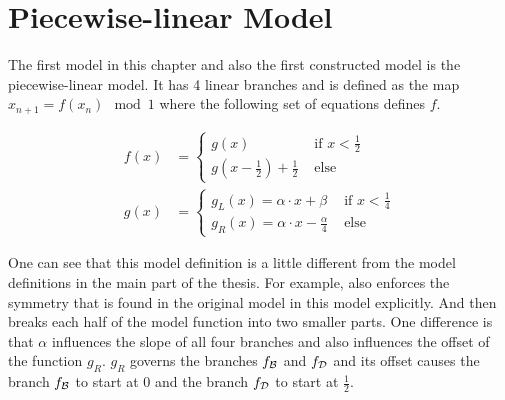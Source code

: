 \section{Piecewise-linear Model}

The first model in this chapter and also the first constructed model is the piecewise-linear model.
It has 4 linear branches and is defined as the map $x_{n+1} = f(x_n) \mod 1$ where the following set of equations defines $f$.

\begin{align}
	f(x) & = \begin{cases}
		         g(x)                                        & \text{ if } x < \frac{1}{2} \\
		         g\left(x - \frac{1}{2}\right) + \frac{1}{2} & \text{ else}
	         \end{cases} \label{equ:app.model.lin.f} \\
	g(x) & = \begin{cases}
		         g_L(x) = \alpha \cdot x + \beta            & \text{ if } x < \frac{1}{4} \\
		         g_R(x) = \alpha \cdot x - \frac{\alpha}{4} & \text{ else}
	         \end{cases} \label{equ:app.model.lin.g}
\end{align}

One can see that this model definition is a little different from the model definitions in the main part of the thesis.
For example,  also enforces the symmetry that is found in the original model in this model explicitly.
And  then breaks each half of the model function into two smaller parts.
One difference is that $\alpha$ influences the slope of all four branches and also influences the offset of the function $g_R$.
$g_R$ governs the branches $f_{\mathcal{B}}$ and $f_{\mathcal{D}}$ and its offset causes the branch $f_{\mathcal{B}}$ to start at $0$ and the branch $f_{\mathcal{D}}$ to start at $\frac{1}{2}$.


